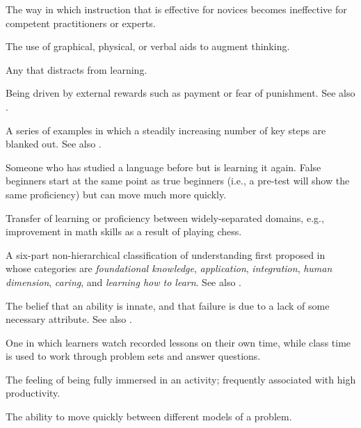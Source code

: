 \begin{description}
 The way in which
instruction that is effective for novices becomes ineffective for competent
practitioners or experts.

 The use of graphical,
physical, or verbal aids to augment thinking.

 Any 
that distracts from learning.

 Being driven by external
rewards such as payment or fear of punishment. See
also .

 A series of examples in which a steadily
increasing number of key steps are blanked out. See
also .

 Someone who has studied a language
before but is learning it again. False beginners start at the same point as true
beginners (i.e., a pre-test will show the same proficiency) but can move much
more quickly.

 Transfer of learning or proficiency
between widely-separated domains, e.g., improvement in math skills as a result
of playing chess.

 A six-part non-hierarchical
classification of understanding first proposed in~\cite{Fink2013} whose
categories are \emph{foundational knowledge}, \emph{application},
\emph{integration}, \emph{human dimension}, \emph{caring}, and \emph{learning
  how to learn}. See also .

 The belief that an ability is innate,
and that failure is due to a lack of some necessary attribute. See also
.

 One in which learners watch
recorded lessons on their own time, while class time is used to work through
problem sets and answer questions.

 The feeling of being fully immersed in an activity;
frequently associated with high productivity.

 The ability to move
quickly between different models of a problem.


\end{description}
